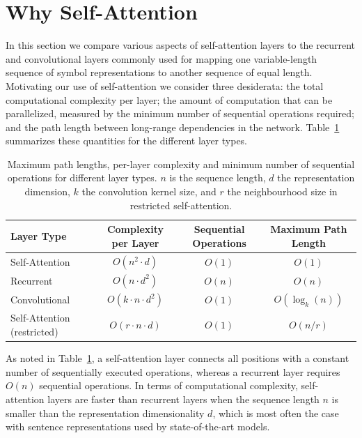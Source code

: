 \documentclass[10pt,letterpaper]{article}
\begin{document}
\section{Why Self-Attention}
\label{sec:why}
In this section we compare various aspects of self-attention layers to the
recurrent and convolutional layers commonly used for mapping one variable-length
sequence of symbol representations to another sequence of equal length. Motivating
our use of self-attention we consider three desiderata: the total computational
complexity per layer; the amount of computation that can be parallelized, measured
by the minimum number of sequential operations required; and the path length
between long-range dependencies in the network. Table~\ref{tab:complexity}
summarizes these quantities for the different layer types.

\begin{table}[t]
\centering
\caption{Maximum path lengths, per-layer complexity and minimum number of
sequential operations for different layer types. $n$ is the sequence length, $d$ the
representation dimension, $k$ the convolution kernel size, and $r$ the neighbourhood
size in restricted self-attention.}
\label{tab:complexity}
\begin{tabular}{@{}lccc@{}}
\toprule
Layer Type & Complexity per Layer & Sequential Operations & Maximum Path Length \\
\midrule
Self-Attention              & $O(n^2\cdot d)$         & $O(1)$ & $O(1)$ \\
Recurrent                   & $O(n\cdot d^2)$         & $O(n)$ & $O(n)$ \\
Convolutional               & $O(k\cdot n\cdot d^2)$  & $O(1)$ & $O(\log_k(n))$ \\
Self-Attention (restricted) & $O(r\cdot n\cdot d)$    & $O(1)$ & $O(n/r)$ \\
\bottomrule
\end{tabular}
\end{table}

As noted in Table~\ref{tab:complexity}, a self-attention layer connects all
positions with a constant number of sequentially executed operations, whereas a
recurrent layer requires $O(n)$ sequential operations. In terms of computational
complexity, self-attention layers are faster than recurrent layers when the
sequence length $n$ is smaller than the representation dimensionality $d$, which is
most often the case with sentence representations used by state-of-the-art models.
\end{document}
